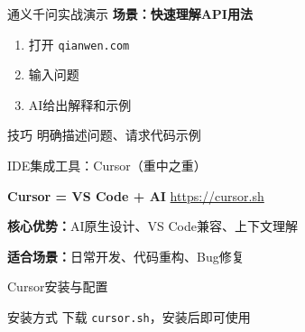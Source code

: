 \begin{frame}{通义千问实战演示}
	\tiny
	\textbf{场景：快速理解API用法}
	\begin{enumerate}
		\item 打开 \texttt{qianwen.com}
		\item 输入问题
		\item AI给出解释和示例
	\end{enumerate}

	\vspace{0.2cm}

	\begin{exampleblock}{技巧}
		明确描述问题、请求代码示例
	\end{exampleblock}
\end{frame}


\begin{frame}{IDE集成工具：Cursor（重中之重）}
	\tiny
	\begin{center}
		\Huge \textbf{Cursor = VS Code + AI}
		\textcolor{blue}{\url{https://cursor.sh}}
	\end{center}

	\vspace{0.2cm}

	\textbf{核心优势：}AI原生设计、VS Code兼容、上下文理解

	\textbf{适合场景：}日常开发、代码重构、Bug修复
\end{frame}

\begin{frame}{Cursor安装与配置}
	\scriptsize
	\begin{alertblock}{安装方式}
		下载 \texttt{cursor.sh}，安装后即可使用
	\end{alertblock}
\end{frame}

